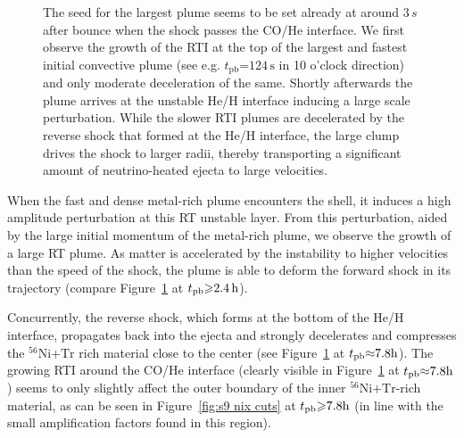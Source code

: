 \documentclass[fleqn,usenatbib]{mnras}
\newcommand{\tpb}{\ensuremath{t_{\text{pb}}}}
\newcommand{\nickel}{\ensuremath{\mathrm{^{56}Ni}}\xspace}
\newcommand{\tracer}{\ensuremath{\mathrm{Tr}}\xspace}
\newcommand{\s}{\ensuremath{\text{s}}}
\begin{document}
\begin{figure}
{        The seed for the largest plume seems to be set already at around $3\,s$ 
        after bounce when the shock passes the CO/He interface. We first observe
        the growth of the RTI at the top of the largest and fastest initial convective plume 
        (see e.g. $\tpb\mathord{=}124\,\s$ in 10 o'clock direction) 
        and only moderate deceleration of the same.
        Shortly afterwards the plume arrives at the unstable He/H interface 
        inducing a large scale perturbation.
        While the slower RTI plumes are decelerated by the reverse shock that formed 
        at the He/H interface, the large
        clump drives the shock to larger radii, thereby transporting a 
        significant amount of neutrino-heated ejecta to large velocities.
    }
\label{fig:s9 rho cuts}
\end{figure}%

When the fast and dense metal-rich plume encounters the shell, it induces a high amplitude perturbation at this RT unstable layer. 
From this perturbation, aided by the large initial momentum of the metal-rich plume, we observe the growth of a large RT plume. As matter is accelerated by the instability to higher velocities than the speed of the shock, the plume is able to deform the forward shock in its trajectory (compare Figure~\ref{fig:s9 rho cuts} at $\tpb\mathord{\geq}2.4\,\rm h$).

Concurrently, the reverse shock, which forms at the bottom of the He/H interface, 
propagates back into the ejecta and strongly decelerates and compresses the 
$\nickel\mathord{+}\tracer$ rich material close to the center 
(see Figure~\ref{fig:s9 rho cuts} at $\tpb\mathord{\approx}7.8\rm h$). 
The growing RTI around the CO/He interface (clearly visible in Figure~\ref{fig:s9 rho cuts} at
$\tpb\mathord{\approx}7.8\rm h$)
seems to only slightly affect the outer boundary of the inner $\nickel\mathord{+}\tracer$-rich
material, as can be seen in Figure~\ref{fig:s9 nix cuts} at $\tpb\mathord{\geq}7.8\rm h$ (in
line with the small amplification factors found in this region).
\end{document}
